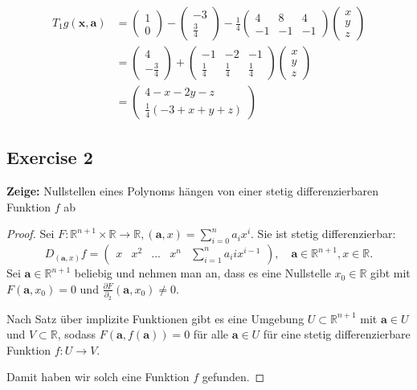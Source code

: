 \documentclass[a4paper, landscape,twocolumn,fontsize=9pt]{scrartcl}
\renewcommand{\hline}{\noindent\makebox[\linewidth]{\rule{12cm}{1pt}}}
\begin{document}
\begin{align*}
	T_1g(\mathbf x, \mathbf a) &= \begin{pmatrix}
	1 \\ 0 
	\end{pmatrix} - \begin{pmatrix}
		-3 \\ \frac{3}{4}
	\end{pmatrix} - \frac{1}{4}\begin{pmatrix}
		4 & 8 & 4 \\
		-1 & -1 & -1
	\end{pmatrix} \begin{pmatrix}
		x \\ y \\ z
	\end{pmatrix}  \\
	&= \begin{pmatrix}
		4 \\ -\frac{3}{4}
	\end{pmatrix} + \begin{pmatrix}
		-1 & -2 & -1 \\ \frac{1}{4} & \frac{1}{4} & \frac{1}{4}
	\end{pmatrix}\begin{pmatrix}
	x \\ y \\ z
	\end{pmatrix} \\
	&= \begin{pmatrix}
	4 -x -2y - z \\
	\frac{1}{4}(- 3 + x + y + z)
	\end{pmatrix}
\end{align*}

\hline


\subsection*{Exercise 2}
\textbf{Zeige:} Nullstellen eines Polynoms hängen  von einer stetig differenzierbaren Funktion $f$ ab

\begin{proof}
Sei $F: \mathbb R^{n+1} \times \mathbb R \to \mathbb R, (\mathbf a, x) = \sum^n_{i=0}a_i x^{i}$. Sie ist stetig differenzierbar:
\[
	D_{(\mathbf a,x)}f = \begin{pmatrix}
		x & x^2 & ... & x^n & \sum^n_{i=1} a_iix^{i-1}
	\end{pmatrix}, \quad \mathbf a \in \mathbb R^{n+1}, x \in \mathbb R.
\]
Sei $\mathbf a \in \mathbb R^{n+1}$ beliebig und nehmen man an, dass es eine Nullstelle $x_0 \in \mathbb R$ gibt mit $F(\mathbf a, x_0) = 0$ und $\frac{\partial F}{\partial_2}(\mathbf a, x_0) \neq 0$. 

Nach Satz über implizite Funktionen gibt es eine Umgebung $U \subset \mathbb R^{n+1}$ mit $\mathbf a \in U$ und $V \subset \mathbb R$, sodass $F(\mathbf a, f(\mathbf a)) = 0$ für alle $\mathbf a \in U$ für eine stetig differenzierbare Funktion $f: U \to V$.

Damit haben wir solch eine Funktion $f$ gefunden.
\end{proof}
\end{document}
